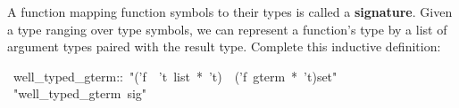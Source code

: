 \begin{exercise}
A function mapping function symbols to their 
types is called a \textbf{signature}.  Given a type 
ranging over type symbols, we can represent a function's type by a
list of argument types paired with the result type. 
Complete this inductive definition:
\begin{isabelle}
\ well_typed_gterm::\ "('f\ \isasymRightarrow \ 't\ list\ *\ 't)\ \isasymRightarrow \ ('f\ gterm\ *\ 't)set"\isanewline
{}\ "well_typed_gterm\ sig"\isanewline
\end{isabelle}
\end{exercise}
